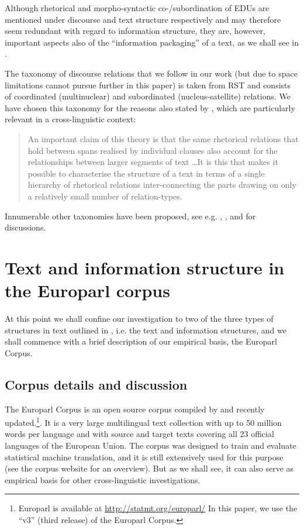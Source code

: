\documentclass[output=paper]{LSP/langsci}
\begin{document}
Although rhetorical and morpho-syntactic co-/subordination of EDUs are mentioned under discourse and text structure respectively and may therefore seem redundant with regard to information structure, they are, however, important aspects also of the ``information packaging'' of a text, as we shall see in .

The taxonomy of discourse relations that we follow in our work (but due to space limitations cannot pursue further in this paper) is taken from RST and consists of coordinated (multinuclear) and subordinated (nucleus-satellite) relations. We have chosen this taxonomy for the reasons also stated by \citet[6]{Bateman1997}, which are particularly relevant in a cross-linguistic context: 

\begin{quote}
An important claim of this theory is that the same rhetorical relations that hold between spans realised by individual clauses also account for the relationships between larger segments of text \ldots It is this that makes it possible to characterise the structure of a text in terms of a single hierarchy of rhetorical relations inter-connecting the parts drawing on only a relatively small number of relation-types. 
\end{quote}

Innumerable other taxonomies have been proposed, see e.g. \citet{Danlos2008}, \citet{Irmer2011}, and \citet{Webber2009} for discussions.

\section{Text and information structure in the Europarl corpus}\label{sec:korzen:3}

At this point we shall confine our investigation to two of the three types of structures in text outlined in , i.e. the text and information structures, and we shall commence with a brief description of our empirical basis, the Europarl Corpus.

\subsection{Corpus details and discussion}\label{sec:korzen:3.1}

The Europarl Corpus is an open source corpus compiled by \citet{Koehn2005} and recently updated.\footnote{Europarl is available at \url{http://statmt.org/europarl/} In this paper, we use the ``v3'' (third release) of the Europarl Corpus.}. It is a very large multilingual text collection with up to 50 million words per language and with source and target texts covering all 23 official languages of the European Union. The corpus was designed to train and evaluate statistical machine translation, and it is still extensively used for this purpose (see the corpus website for an overview). But as we shall see, it can also serve as empirical basis for other cross-linguistic investigations. 
\end{document}
